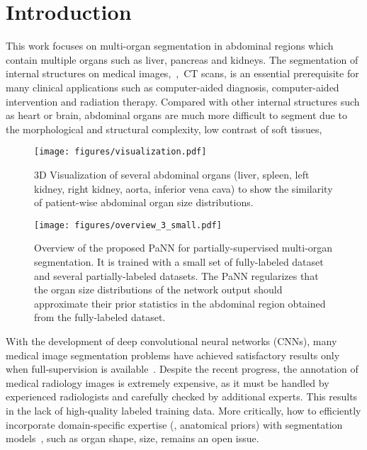\documentclass[10pt,twocolumn,letterpaper]{article}
\begin{document}
\section{Introduction}  \label{sec:intro}
This work focuses on multi-organ segmentation in abdominal regions which contain multiple organs such as liver, pancreas and kidneys. The segmentation of internal structures on medical images,~\eg,~CT scans, is an essential prerequisite for many clinical applications such as computer-aided diagnosis, computer-aided intervention and radiation therapy. Compared with other internal structures such as heart or brain, abdominal organs are much more difficult to segment due to the morphological and structural complexity, low contrast of soft tissues,~\etc 

\begin{figure}[tb]
\centering
\texttt{[image: figures/visualization.pdf]}
\caption{3D Visualization of several abdominal organs (liver, spleen, left kidney, right kidney, aorta, inferior vena cava) to show the similarity of patient-wise abdominal organ size distributions.}
\label{fig:distribution}
\vspace{-1.5em}
 \end{figure}


\begin{figure*}
\centering
\texttt{[image: figures/overview\_3\_small.pdf]}	
\caption{Overview of the proposed PaNN for partially-supervised multi-organ segmentation. It is trained with a small set of fully-labeled dataset and several partially-labeled datasets. The PaNN regularizes that the organ size distributions of the network output should approximate their prior statistics in the abdominal region obtained from the fully-labeled dataset.}
\label{fig:overview}
\vspace{-1em}
\end{figure*}

With the development of deep convolutional neural networks (CNNs), many medical image segmentation problems have achieved satisfactory results only when full-supervision is available~\cite{roth2018multi,roth2018spatial,zhou2017fixed,yu2018recurrent,ronneberger2015u,chen2017voxresnet}. Despite the recent progress, the annotation of medical radiology images is extremely expensive, as it must be handled by experienced radiologists and carefully checked by additional experts. This results in the lack of high-quality labeled training data. More critically, how to efficiently incorporate domain-specific expertise (\eg, anatomical priors) with segmentation models~\cite{dalca2018anatomical,oktay2018anatomically}, such as organ shape, size, remains an open issue.
\end{document}
